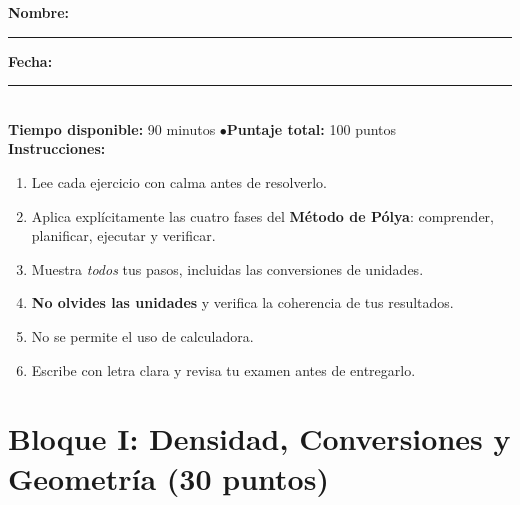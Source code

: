 \documentclass[12pt, letterpaper]{article}
\begin{document}


\vspace{4pt}
\begin{cuadroinfo}
  \small
  \textbf{Nombre:} \rule{0.55\linewidth}{0.4pt} \quad \textbf{Fecha:} \rule{0.15\linewidth}{0.4pt} \\[6pt]
  \textbf{Tiempo disponible:} 90 minutos \quad$\bullet$\quad \textbf{Puntaje total:} 100 puntos \\[4pt]
  \textbf{Instrucciones:}
  \begin{enumerate}[leftmargin=*]
    \item Lee cada ejercicio con calma antes de resolverlo.
    \item Aplica explícitamente las cuatro fases del \textbf{Método de Pólya}: comprender, planificar, ejecutar y verificar.
    \item Muestra \emph{todos} tus pasos, incluidas las conversiones de unidades.
    \item \textbf{No olvides las unidades} y verifica la coherencia de tus resultados.
    \item No se permite el uso de calculadora.
    \item Escribe con letra clara y revisa tu examen antes de entregarlo.
  \end{enumerate}
\end{cuadroinfo}

\vspace{8pt}

\section{Bloque I: Densidad, Conversiones y Geometría (30 puntos)}
\end{document}
